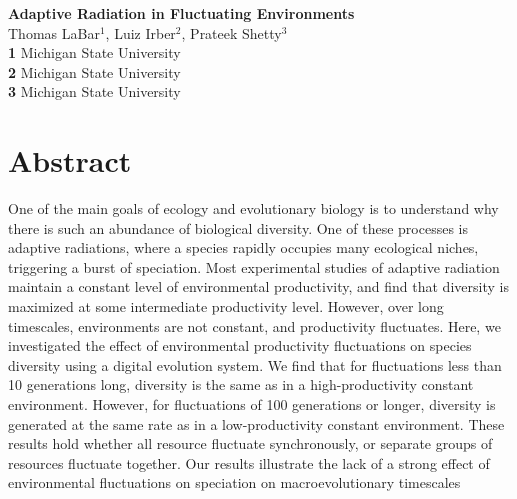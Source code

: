 \documentclass[10pt]{article}
\date{}
\begin{document}
\begin{flushleft}
{\LARGE
\textbf{Adaptive Radiation in Fluctuating Environments}
}
\\
Thomas LaBar$^{1}$, Luiz Irber$^{2}$, Prateek Shetty$^{3}$
\\
{\bf 1} Michigan State University
\\


{\bf 2} Michigan State University
\\
{\bf 3} Michigan State University
\\
\end{flushleft}





\section{Abstract}

\indent One of the main goals of ecology and evolutionary biology is to understand why there is such an abundance of biological diversity. One of these processes is adaptive radiations, where a species rapidly occupies many ecological niches, triggering a burst of speciation. Most experimental studies of adaptive radiation maintain a constant level of environmental productivity, and find that diversity is maximized at some intermediate productivity level. However, over long timescales, environments are not constant, and productivity fluctuates. Here, we investigated the effect of environmental productivity fluctuations on species diversity using a digital evolution system. We find that for fluctuations less than 10 generations long, diversity is the same as in a high-productivity constant environment. However, for fluctuations of 100 generations or longer, diversity is generated at the same rate as in a low-productivity constant environment. These results hold whether all resource fluctuate synchronously, or separate groups of resources fluctuate together. Our results illustrate the lack of a strong effect of environmental fluctuations on speciation on macroevolutionary timescales
\end{document}
